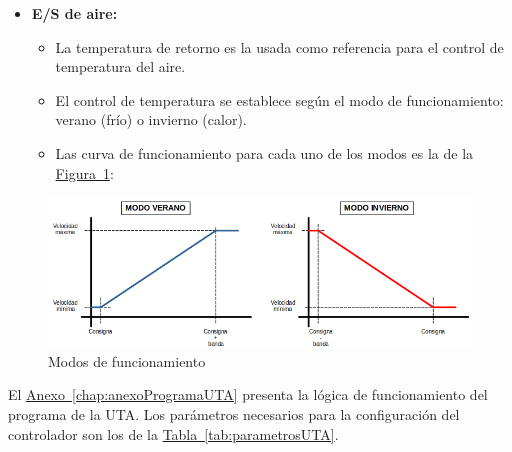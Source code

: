 \begin{itemize}
\begin{itemize}
  \end{itemize}
  \item \textbf{E/S de aire:}
  \begin{itemize}
    \item La temperatura de retorno es la usada como referencia para el control de temperatura del aire.
    \item El control de temperatura se establece según el modo de funcionamiento: verano (frío) o invierno (calor).
    \item Las curva de funcionamiento para cada uno de los modos es la de la \hyperref[figura:curvasModos]{Figura~\ref{figura:curvasModos}}:
  \end{itemize}
\end{itemize}

\begin{figure}[H]
  \centering
  \includegraphics[width=\textwidth, keepaspectratio]{img/curvaModos}
  \caption{Modos de funcionamiento}
  \label{figura:curvasModos}
\end{figure}



El \hyperref[chap:anexoProgramaUTA]{Anexo~\ref{chap:anexoProgramaUTA}} presenta la lógica de funcionamiento del programa de la UTA. Los parámetros necesarios para la configuración del controlador son los de la \hyperref[tab:parametrosUTA]{Tabla~\ref{tab:parametrosUTA}}.

